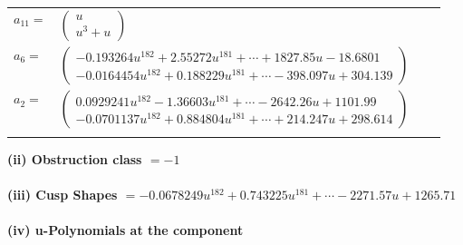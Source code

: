\documentclass[1p]{elsarticle_modified}
\theoremstyle{definition}
\begin{document}
\begin{tabular}{m{7pt} m{180pt} m{7pt} m{180pt} }
\flushright $a_{11}=$&$\begin{pmatrix}u\\u^3+u\end{pmatrix}$ \\
\flushright $a_{6}=$&$\begin{pmatrix}-0.193264 u^{182}+2.55272 u^{181}+\cdots+1827.85 u-18.6801\\-0.0164454 u^{182}+0.188229 u^{181}+\cdots-398.097 u+304.139\end{pmatrix}$ \\
\flushright $a_{2}=$&$\begin{pmatrix}0.0929241 u^{182}-1.36603 u^{181}+\cdots-2642.26 u+1101.99\\-0.0701137 u^{182}+0.884804 u^{181}+\cdots+214.247 u+298.614\end{pmatrix}$\\&\end{tabular}
\flushleft \textbf{(ii) Obstruction class $= -1$}\\~\\
\flushleft \textbf{(iii) Cusp Shapes $= -0.0678249 u^{182}+0.743225 u^{181}+\cdots-2271.57 u+1265.71$}\\~\\
\newpage\renewcommand{\arraystretch}{1}
\flushleft \textbf{(iv) u-Polynomials at the component}\newline \\
\end{document}

